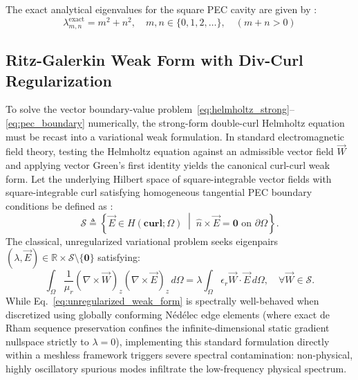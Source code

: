 \documentclass[preprint,12pt]{elsarticle}
\begin{document}
The exact analytical eigenvalues for the square PEC cavity are given by \cite{harrington2001time}:
\begin{equation}
    \lambda_{m,n}^{\mathrm{exact}} = m^2 + n^2, \quad m,n \in \{0, 1, 2, \dots\}, \quad (m+n > 0)
    \label{eq:analytical_eigenvalues}
\end{equation}

\subsection{Ritz-Galerkin Weak Form with Div-Curl Regularization}
\label{subsec:weak_form_regularization}

To solve the vector boundary-value problem~\eqref{eq:helmholtz_strong}--\eqref{eq:pec_boundary} numerically, the strong-form double-curl Helmholtz equation must be recast into a variational weak formulation. In standard electromagnetic field theory, testing the Helmholtz equation against an admissible vector field $\vec{W}$ and applying vector Green's first identity yields the canonical curl-curl weak form. Let the underlying Hilbert space of square-integrable vector fields with square-integrable curl satisfying homogeneous tangential PEC boundary conditions be defined as \cite{monk2003finite, bossavit1998computational, boffi2013mixed}:
\begin{equation}
    \mathcal{S} \triangleq \left\{ \vec{E} \in H(\mathbf{curl}; \Omega) \;\middle|\; \hat{n} \times \vec{E} = \mathbf{0} \text{ on } \partial\Omega \right\}.
    \label{eq:hilbert_space_S}
\end{equation}
The classical, unregularized variational problem seeks eigenpairs $(\lambda, \vec{E}) \in \mathbb{R} \times \mathcal{S} \setminus \{\mathbf{0}\}$ satisfying:
\begin{equation}
    \int_{\Omega} \frac{1}{\mu_r} (\nabla \times \vec{W})_z (\nabla \times \vec{E})_z \, d\Omega = \lambda \int_{\Omega} \epsilon_r \vec{W} \cdot \vec{E} \, d\Omega, \quad \forall \vec{W} \in \mathcal{S}.
    \label{eq:unregularized_weak_form}
\end{equation}
While Eq.~\eqref{eq:unregularized_weak_form} is spectrally well-behaved when discretized using globally conforming N\'ed\'elec edge elements (where exact de Rham sequence preservation confines the infinite-dimensional static gradient nullspace strictly to $\lambda = 0$), implementing this standard formulation directly within a meshless framework triggers severe spectral contamination: non-physical, highly oscillatory spurious modes infiltrate the low-frequency physical spectrum.
\end{document}
